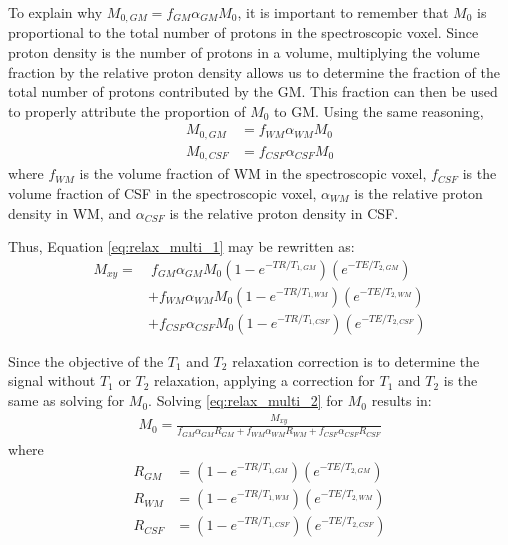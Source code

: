 \documentclass{article}
\begin{document}
To explain why $M_{0,GM} = f_{GM} \alpha_{GM} M_0$, it is important to remember that $M_0$ is proportional to the total number of protons in the spectroscopic voxel. Since proton density is the number of protons in a volume, multiplying the volume fraction by the relative proton density allows us to determine the fraction of the total number of protons contributed by the GM. This fraction can then be used to properly attribute the proportion of $M_0$ to GM. Using the same reasoning,
\begin{align*}
	M_{0,GM} &= f_{WM} \alpha_{WM} M_0 \\
	M_{0,CSF} &= f_{CSF} \alpha_{CSF} M_0
\end{align*}
where $f_{WM}$ is the volume fraction of WM in the spectroscopic voxel, $f_{CSF}$ is the volume fraction of CSF in the spectroscopic voxel, $\alpha_{WM}$ is the relative proton density in WM, and $\alpha_{CSF}$ is the relative proton density in CSF.

Thus, Equation \eqref{eq:relax_multi_1} may be rewritten as:
\begin{align}
	\label{eq:relax_multi_2}	
	M_{xy} =	 & ~ f_{GM} \alpha_{GM} M_0 \left(1-e^{-TR/T_{1, GM}}\right)\left(e^{-TE/T_{2, GM}}\right) \nonumber \\
			 & + f_{WM} \alpha_{WM} M_0 \left(1-e^{-TR/T_{1, WM}}\right)\left(e^{-TE/T_{2, WM}}\right) \\
			 & + f_{CSF} \alpha_{CSF} M_0 \left(1-e^{-TR/T_{1, CSF}}\right)\left(e^{-TE/T_{2, CSF}}\right) \nonumber
\end{align}

Since the objective of the $T_1$ and $T_2$ relaxation correction is to determine the signal without $T_1$ or $T_2$ relaxation, applying a correction for $T_1$ and $T_2$ is the same as solving for $M_0$. Solving \eqref{eq:relax_multi_2} for $M_0$ results in:
\begin{align}
	M_0 = \frac{M_{xy}}{f_{GM} \alpha_{GM} R_{GM} + f_{WM} \alpha_{WM} R_{WM} + f_{CSF} \alpha_{CSF}  R_{CSF}}
	\label{eq:relax_corr}
\end{align}
where
\begin{align*}
	R_{GM} &= \left(1-e^{-TR/T_{1, GM}}\right)\left(e^{-TE/T_{2, GM}}\right) \\
	R_{WM} &= \left(1-e^{-TR/T_{1, WM}}\right)\left(e^{-TE/T_{2, WM}}\right) \\
	R_{CSF} &= \left(1-e^{-TR/T_{1, CSF}}\right)\left(e^{-TE/T_{2, CSF}}\right) \\
\end{align*}
\end{document}
